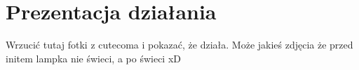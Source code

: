 \chapter{Prezentacja działania}
\label{cha:presentation}

Wrzucić tutaj fotki z cutecoma i pokazać, że działa. Może jakieś zdjęcia że przed initem lampka nie świeci, a po świeci xD


